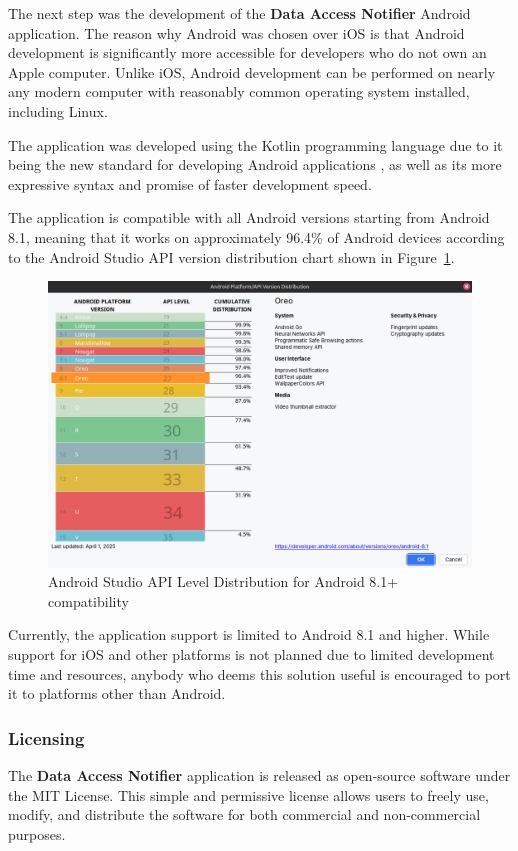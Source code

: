 The next step was the development of the \textbf{Data Access Notifier} Android application. The reason why Android was chosen over iOS is that Android development is significantly more accessible for developers who do not own an Apple computer. Unlike iOS, Android development can be performed on nearly any modern computer with reasonably common operating system installed, including Linux.

The application was developed using the Kotlin programming language due to it being the new standard for developing Android applications \cite{kotlin-first}, as well as its more expressive syntax and promise of faster development speed.

The application is compatible with all Android versions starting from Android 8.1, meaning that it works on approximately 96.4\% of Android devices according to the Android Studio API version distribution chart shown in Figure~\ref{fig:android-api-distribution}.

\begin{figure}[H]
\centering
\includegraphics[width=450px]{english/figures/Screenshot from 2025-08-11 22-58-16.png}
\caption{Android Studio API Level Distribution for Android 8.1+ compatibility}
\label{fig:android-api-distribution}
\end{figure}

Currently, the application support is limited to Android 8.1 and higher. While support for iOS and other platforms is not planned due to limited development time and resources, anybody who deems this solution useful is encouraged to port it to platforms other than Android.

\subsubsection{Licensing}
The \textbf{Data Access Notifier} application is released as open-source software under the MIT License. This simple and permissive license allows users to freely use, modify, and distribute the software for both commercial and non-commercial purposes. 

